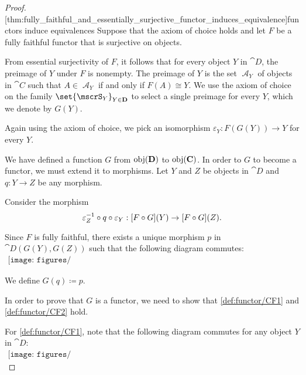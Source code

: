 \begin{proof}
  [thm:fully_faithful_and_essentially_surjective_functor_induces_equivalence]{functors induce equivalences} Suppose that the axiom of choice holds and let \( F \) be a fully faithful functor that is surjective on objects.

  From essential surjectivity of \( F \), it follows that for every object \( Y \) in \( \cat{D} \), the preimage of \( Y \) under \( F \) is nonempty. The preimage of \( Y \) is the set \( \mscrA_Y \) of objects in \( \cat{C} \) such that \( A \in \mscrA_Y \) if and only if \( F(A) \cong Y \). We use the axiom of choice on the family \( \set{ \mscrS_Y }_{Y \in \cat{D}} \) to select a single preimage for every \( Y \), which we denote by \( G(Y) \).

  Again using the axiom of choice, we pick an isomorphism \( \varepsilon_Y: F(G(Y)) \to Y \) for every \( Y \).

  We have defined a function \( G \) from \( \operatorname{obj}(\operatorname{\mathbf{D}}) \) to \( \operatorname{obj}(\operatorname{\mathbf{C}}) \). In order to \( G \) to become a functor, we must extend it to morphisms. Let \( Y \) and \( Z \) be objects in \( \cat{D} \) and \( q: Y \to Z \) be any morphism.

  Consider the morphism
  \begin{equation*}
    \varepsilon_Z^{-1} \bincirc q \bincirc \varepsilon_Y: [F \bincirc G](Y) \to [F \bincirc G](Z).
  \end{equation*}

  Since \( F \) is fully faithful, there exists a unique morphism \( p \) in \( \cat{D}(G(Y), G(Z)) \) such that the following diagram commutes:
  \begin{equation}\label{eq:thm__fully_faithful_and_essentially_surjective_functor_induces_equivalence/inverse_morphism_definition}
    \begin{aligned}
      \texttt{[image: figures/thm\_\_fully\_faithful\_and\_essentially\_surjective\_functor\_induces\_equivalence.pdf]}
    \end{aligned}
  \end{equation}

  We define \( G(q) \coloneqq p \).

  In order to prove that \( G \) is a functor, we need to show that \ref{def:functor/CF1} and \ref{def:functor/CF2} hold.

  For \ref{def:functor/CF1}, note that the following diagram commutes for any object \( Y \) in \( \cat{D} \):
  \begin{equation}\label{eq:thm__fully_faithful_and_essentially_surjective_functor_induces_equivalence/identity}
    \begin{aligned}
      \texttt{[image: figures/thm\_\_fully\_faithful\_and\_essentially\_surjective\_functor\_induces\_equivalence.pdf]}
    \end{aligned}
  \end{equation}


\end{proof}

